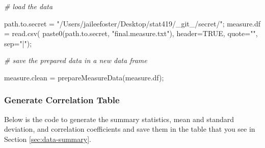 \documentclass[]{article}
\newenvironment{Shaded}{\begin{snugshade}}{\end{snugshade}}
\newcommand{\AttributeTok}[1]{\textcolor[rgb]{0.77,0.63,0.00}{#1}}
\newcommand{\CommentTok}[1]{\textcolor[rgb]{0.56,0.35,0.01}{\textit{#1}}}
\newcommand{\ConstantTok}[1]{\textcolor[rgb]{0.00,0.00,0.00}{#1}}
\newcommand{\FunctionTok}[1]{\textcolor[rgb]{0.00,0.00,0.00}{#1}}
\newcommand{\NormalTok}[1]{#1}
\newcommand{\OtherTok}[1]{\textcolor[rgb]{0.56,0.35,0.01}{#1}}
\newcommand{\StringTok}[1]{\textcolor[rgb]{0.31,0.60,0.02}{#1}}
\begin{document}
\begin{Shaded}
\begin{Highlighting}[]
\CommentTok{\# load the data}

\NormalTok{path.to.secret }\OtherTok{=} \StringTok{"/Users/jaileefoster/Desktop/stat419/\_git\_/secret/"}\NormalTok{;}
\NormalTok{measure.df }\OtherTok{=} \FunctionTok{read.csv}\NormalTok{( }\FunctionTok{paste0}\NormalTok{(path.to.secret, }\StringTok{"final.measure.txt"}\NormalTok{), }\AttributeTok{header=}\ConstantTok{TRUE}\NormalTok{, }
                           \AttributeTok{quote=}\StringTok{""}\NormalTok{, }\AttributeTok{sep=}\StringTok{"|"}\NormalTok{);}

\CommentTok{\# save the prepared data in a new data frame}

\NormalTok{measure.clean }\OtherTok{=} \FunctionTok{prepareMeasureData}\NormalTok{(measure.df);}
\end{Highlighting}
\end{Shaded}

\subsubsection{Generate Correlation Table}

Below is the code to generate the summary statistics, mean and standard
deviation, and correlation coefficients and save them in the table that
you see in Section \ref{sec:data-summary}.
\end{document}
